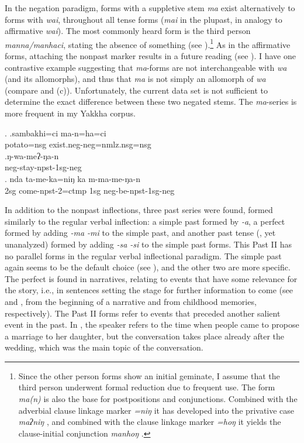 In the negation paradigm, forms with a suppletive stem  \emph{ma} exist alternatively to forms with \emph{wai}, throughout all tense forms (\emph{mai} in the plupast, in analogy to affirmative \emph{wai}). The most commonly heard form is the third person \emph{manna/manhaci}, stating the absence of something (see \Next[a]).\footnote{Since the other person forms show an initial geminate, I assume that the third person underwent formal reduction due to frequent use. The form \emph{ma(n)} is also the base for postpositions and conjunctions. Combined with the adverbial clause linkage marker \emph{=niŋ} it has  developed into the privative case \emph{maʔniŋ} , and combined with the clause linkage marker  \emph{=hoŋ} it yields  the clause-initial conjunction \emph{manhoŋ} .} As in the affirmative forms, attaching the nonpast marker results in a future reading (see  \Next[c]). I have one contrastive example suggesting that \emph{ma}-forms are not interchangeable with \emph{wa} (and its allomorphs), and thus that \emph{ma} is not simply an allomorph of \emph{wa} (compare \Next[b] and (c)). Unfortunately, the current data set is not sufficient to determine the exact difference between these two negated stems. The \emph{ma}-series is more frequent in my Yakkha corpus. 

\ex. \ag.sambakhi=ci ma-n=ha=ci\\
potato{\sc =nsg} exist{\sc .neg-neg=nmlz.nsg=nsg}\\
\bg.ŋ-wa-meʔ-ŋa-n\\
{\sc neg-}stay{\sc -npst-1sg-neg}\\
\bg.      nda ta-me-ka=niŋ ka m-ma-me-ŋa-n\\
{\sc 2sg} come{\sc -npst-2=ctmp} {\sc 1sg} {\sc neg-}be{\sc -npst-1sg-neg}\\


In addition to the nonpast inflections, three past series were found, formed similarly to the regular verbal inflection: a simple past formed by \emph{-a},  a perfect formed by adding \emph{-ma \ti -mi} to the simple past, and another past tense (, yet unanalyzed) formed by adding \emph{-sa \ti -si} to the simple past forms. This Past II  has no parallel forms in the regular verbal inflectional paradigm.  The simple past again seems to be the default choice (see \Next[a]), and the other two are more specific. The perfect is found in narratives, relating to events that have some relevance for the story, i.e., in sentences setting the stage for further information to come (see \Next[b] and \Next[c], from the beginning of a narrative and from childhood memories, respectively). The Past II forms refer to events that preceded another salient event in the past. In \Next[d], the speaker  refers to the time when people came to propose a marriage to her daughter, but the conversation  takes place already after the wedding, which was the main topic of the conversation. 


